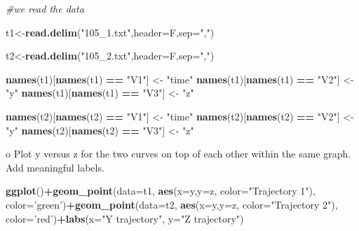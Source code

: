 \documentclass[
]{article}
\newenvironment{Shaded}{\begin{snugshade}}{\end{snugshade}}
\newcommand{\CommentTok}[1]{\textcolor[rgb]{0.56,0.35,0.01}{\textit{#1}}}
\newcommand{\DataTypeTok}[1]{\textcolor[rgb]{0.13,0.29,0.53}{#1}}
\newcommand{\KeywordTok}[1]{\textcolor[rgb]{0.13,0.29,0.53}{\textbf{#1}}}
\newcommand{\NormalTok}[1]{#1}
\newcommand{\OperatorTok}[1]{\textcolor[rgb]{0.81,0.36,0.00}{\textbf{#1}}}
\newcommand{\StringTok}[1]{\textcolor[rgb]{0.31,0.60,0.02}{#1}}
\begin{document}
\begin{Shaded}
\begin{Highlighting}[]
\CommentTok{#we read the data}

\NormalTok{t1<-}\KeywordTok{read.delim}\NormalTok{(}\StringTok{"105_1.txt"}\NormalTok{,}\DataTypeTok{header=}\NormalTok{F,}\DataTypeTok{sep=}\StringTok{","}\NormalTok{)}

\NormalTok{t2<-}\KeywordTok{read.delim}\NormalTok{(}\StringTok{"105_2.txt"}\NormalTok{,}\DataTypeTok{header=}\NormalTok{F,}\DataTypeTok{sep=}\StringTok{","}\NormalTok{)}

\KeywordTok{names}\NormalTok{(t1)[}\KeywordTok{names}\NormalTok{(t1) }\OperatorTok{==}\StringTok{ "V1"}\NormalTok{] <-}\StringTok{ "time"}
\KeywordTok{names}\NormalTok{(t1)[}\KeywordTok{names}\NormalTok{(t1) }\OperatorTok{==}\StringTok{ "V2"}\NormalTok{] <-}\StringTok{ "y"}
\KeywordTok{names}\NormalTok{(t1)[}\KeywordTok{names}\NormalTok{(t1) }\OperatorTok{==}\StringTok{ "V3"}\NormalTok{] <-}\StringTok{ "z"}


\KeywordTok{names}\NormalTok{(t2)[}\KeywordTok{names}\NormalTok{(t2) }\OperatorTok{==}\StringTok{ "V1"}\NormalTok{] <-}\StringTok{ "time"}
\KeywordTok{names}\NormalTok{(t2)[}\KeywordTok{names}\NormalTok{(t2) }\OperatorTok{==}\StringTok{ "V2"}\NormalTok{] <-}\StringTok{ "y"}
\KeywordTok{names}\NormalTok{(t2)[}\KeywordTok{names}\NormalTok{(t2) }\OperatorTok{==}\StringTok{ "V3"}\NormalTok{] <-}\StringTok{ "z"}
\end{Highlighting}
\end{Shaded}

o Plot y versus z for the two curves on top of each other within the
same graph. Add meaningful labels.

\begin{Shaded}
\begin{Highlighting}[]
\KeywordTok{ggplot}\NormalTok{()}\OperatorTok{+}\KeywordTok{geom_point}\NormalTok{(}\DataTypeTok{data=}\NormalTok{t1, }\KeywordTok{aes}\NormalTok{(}\DataTypeTok{x=}\NormalTok{y,}\DataTypeTok{y=}\NormalTok{z, }\DataTypeTok{color=}\StringTok{"Trajectory 1"}\NormalTok{), }\DataTypeTok{color=}\StringTok{'green'}\NormalTok{)}\OperatorTok{+}\KeywordTok{geom_point}\NormalTok{(}\DataTypeTok{data=}\NormalTok{t2, }\KeywordTok{aes}\NormalTok{(}\DataTypeTok{x=}\NormalTok{y,}\DataTypeTok{y=}\NormalTok{z, }\DataTypeTok{color=}\StringTok{"Trajectory 2"}\NormalTok{), }\DataTypeTok{color=}\StringTok{'red'}\NormalTok{)}\OperatorTok{+}\KeywordTok{labs}\NormalTok{(}\DataTypeTok{x=}\StringTok{"Y trajectory"}\NormalTok{, }\DataTypeTok{y=}\StringTok{"Z trajectory"}\NormalTok{)}
\end{Highlighting}
\end{Shaded}
\end{document}
